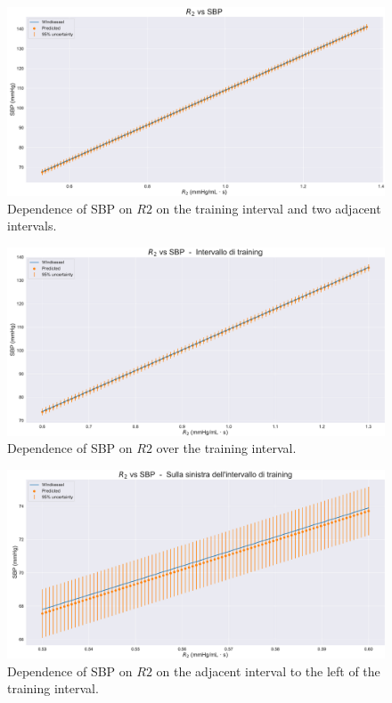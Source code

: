\vspace{1cm}

\begin{figure}[!htb]
    \centering
    \includegraphics[width=1\textwidth]{images/Training (risultati)/SBP/SBP - R2 - full.pdf}
    \caption{Dependence of SBP on $R2$ on the training interval and two adjacent intervals.}
    \label{SBP - R2 - full}
\end{figure}

\vspace{0.32cm}

\begin{figure}[!htb]
    \centering
    \includegraphics[width=1\textwidth]{images/Training (risultati)/SBP/SBP - R2 - training.pdf}
    \caption{Dependence of SBP on $R2$ over the training interval.}
    \label{SBP - R2 - training}
\end{figure}

\begin{figure}
    \centering
    \includegraphics[width=1\textwidth]{images/Training (risultati)/SBP/SBP - R2 - sx.pdf}
    \caption{Dependence of SBP on $R2$ on the adjacent interval to the left of the training interval.}
    \label{SBP - R2 - sx}
\end{figure}



